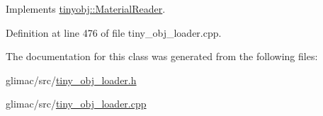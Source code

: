 Implements \hyperlink{classtinyobj_1_1_material_reader_afc27ac917abd33dc3ec4a9ae7a519962}{tinyobj\+::\+Material\+Reader}.



Definition at line 476 of file tiny\+\_\+obj\+\_\+loader.\+cpp.



The documentation for this class was generated from the following files\+:\begin{DoxyCompactItemize}
\item 
glimac/src/\hyperlink{tiny__obj__loader_8h}{tiny\+\_\+obj\+\_\+loader.\+h}\item 
glimac/src/\hyperlink{tiny__obj__loader_8cpp}{tiny\+\_\+obj\+\_\+loader.\+cpp}\end{DoxyCompactItemize}
